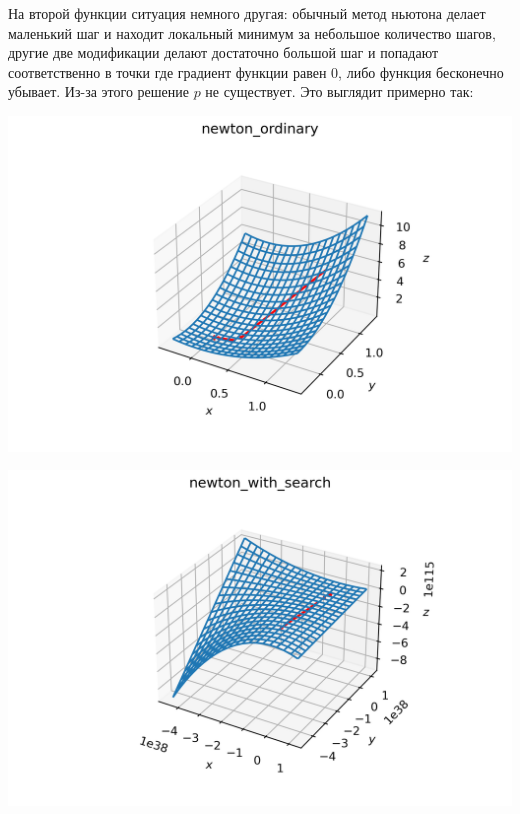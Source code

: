 \documentclass[english]{article}
\begin{document}
\begin{enumerate}
  На второй функции ситуация немного другая: обычный метод ньютона
  делает маленький шаг и находит локальный минимум за небольшое
  количество шагов, другие две модификации делают достаточно большой
  шаг и попадают соответственно в точки где градиент функции равен \(0\),
  либо функция бесконечно убывает. Из-за этого решение \(p\) не
  существует. Это выглядит примерно так:
  \begin{center}
    \includegraphics[scale=0.7]{plots/3D_newton_ordinary_2.png}
  \end{center}
  \begin{center}
    \includegraphics[scale=0.7]{plots/3D_newton_with_search_2.png}
  \end{center}
  \begin{center}

\end{center}
\end{enumerate}
\end{document}
